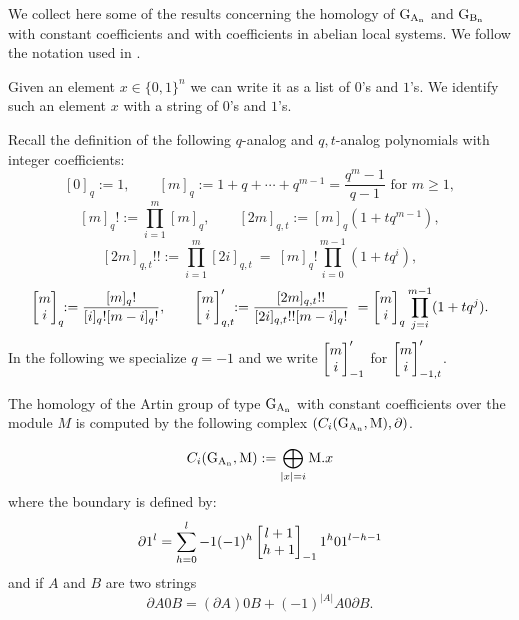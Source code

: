 We collect here some of the results
concerning the homology of $\operatorname{G_{A_{n}}}$ and $\operatorname{G_{B_{n}}}$ with constant coefficients and with coefficients in abelian local systems.
We follow the notation used in \cite{calmar}. 

Given an element $x \in \{0,1\}^n$ we can write it as a list of $0$'s and $1$'s. We identify such an element $x$ with a string of $0$'s and $1$'s.

Recall the definition of the following $q$-analog and $q,t$-analog polynomials with integer coefficients:
$$ 
[0]_q :=1, \qquad [m]_q := 1 + q + \cdots + q^{m-1} = \frac{q^m-1}{q-1} \mbox{ for }m\geq 1,
$$
$$
[m]_q! := \prod_{i=1}^m [m]_q, \qquad [2m]_{q,t} := [m]_q (1+tq^{m-1}),
$$
$$
[2m]_{q,t}!! := \prod_{i=1}^m [2i]_{q,t}\ =\ [ m ]_q!
\prod_{i=0}^{m-1} (1+tq^i),
$$
$$
\qbin{m}{i}_{q}\!\!: = \frac{[m]_q!}{[i]_q!
	[m-i]_q!},
\qquad
\qbin{m}{i}_{q,t}'\!\!: = \frac{[2m]_{q,t}!!}{[2i]_{q,t}!! [m-i]_q!} \ =
\qbin{m}{i}_{q}\prod_{j=i}^{m-1}(1+tq^j).
$$
In the following we specialize $q = -1$ and we write $\left[ \! \! \! \begin{array}{c} m \\ i \end{array} \! \! \! \right]_{-1}'$ for $\left[ \! \! \! \begin{array}{c} m \\ i \end{array} \! \! \! \right]_{-1,t}'$.



The homology of the Artin group of type $\operatorname{G_{A_{n}}}$ with constant coefficients over the module $M$ is computed by the following complex $(C_i(\operatorname{G_{A_{n}}}, \mathrm{M}), \partial)$.
\begin{df}
$$
C_i(\operatorname{G_{A_{n}}}, \mathrm{M}) := \bigoplus_{|x| = i} \mathrm{M}.x 
$$
where the boundary is defined by:
$$
\partial 1^l = \sum_{h=0}^l-1 (-1)^h \left[ \! \! \! \begin{array}{c} l+1 \\ h+1 \end{array} \! \! \! \right]_{-1} 1^{h}01^{l-h-1}
$$
and if $A$ and $B$ are two strings
$$
\partial A0B = (\partial A)0B + (-1)^{|A|} A0 \partial B.
$$
\end{df}

